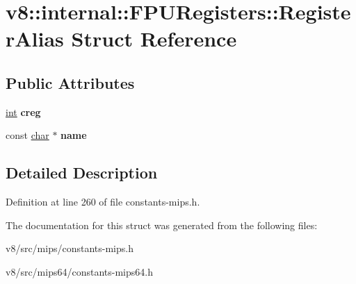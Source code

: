 \hypertarget{structv8_1_1internal_1_1FPURegisters_1_1RegisterAlias}{}\section{v8\+:\+:internal\+:\+:F\+P\+U\+Registers\+:\+:Register\+Alias Struct Reference}
\label{structv8_1_1internal_1_1FPURegisters_1_1RegisterAlias}
\subsection*{Public Attributes}
\begin{DoxyCompactItemize}
\item 
\mbox{\label{structv8_1_1internal_1_1FPURegisters_1_1RegisterAlias_aa9c6ec67f3d8b50d8832cee4fee5eda1}} 
\mbox{\hyperlink{classint}{int}} {\bfseries creg}
\item 
\mbox{\label{structv8_1_1internal_1_1FPURegisters_1_1RegisterAlias_af7e1a4c08b94dd3b17c3311897eee432}} 
const \mbox{\hyperlink{classchar}{char}} $\ast$ {\bfseries name}
\end{DoxyCompactItemize}


\subsection{Detailed Description}


Definition at line 260 of file constants-\/mips.\+h.



The documentation for this struct was generated from the following files\+:\begin{DoxyCompactItemize}
\item 
v8/src/mips/constants-\/mips.\+h\item 
v8/src/mips64/constants-\/mips64.\+h\end{DoxyCompactItemize}
